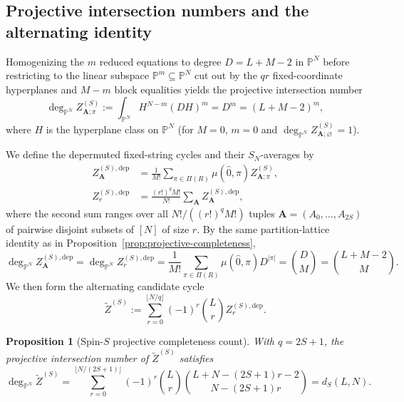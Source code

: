 \documentclass[11pt]{article}
\newtheorem{proposition}{Proposition}[section]
\theoremstyle{definition}
\begin{document}
\subsection{Projective intersection numbers and the alternating identity}

Homogenizing the $m$ reduced equations to degree $D=L+M-2$ in $\mathbb{P}^N$ before restricting to the linear subspace $\mathbb{P}^m\subseteq\mathbb{P}^N$ cut out by the $qr$ fixed-coordinate hyperplanes and $M-m$ block equalities yields the projective intersection number
\begin{equation}\label{eq:spin-S-partition-degree}
 \deg_{\mathbb{P}^N}Z_{\mathbf{A};\pi}^{(S)}
 :=\int_{\mathbb{P}^N}H^{N-m}(DH)^m=D^m=(L+M-2)^m,
\end{equation}
where $H$ is the hyperplane class on $\mathbb{P}^N$ (for $M=0$, $m=0$ and $\deg_{\mathbb{P}^N}Z_{\mathbf{A};\varnothing}^{(S)}=1$).

We define the depermuted fixed-string cycles and their $S_N$-averages by
\begin{equation}\label{eq:spin-S-partition-sums}
 \begin{aligned}
 Z_{\mathbf{A}}^{(S),\mathrm{dep}}
 &=\frac{1}{M!}\sum_{\pi\in\Pi(R)}
                 \mu(\hat{0},\pi)Z_{\mathbf{A};\pi}^{(S)},\\
 Z_r^{(S),\mathrm{dep}}
 &=\frac{(r!)^q M!}{N!}
       \sum_{\mathbf{A}}Z_{\mathbf{A}}^{(S),\mathrm{dep}},
 \end{aligned}
\end{equation}
where the second sum ranges over all $N!/((r!)^q M!)$ tuples $\mathbf{A}=(A_0,\ldots,A_{2S})$ of pairwise disjoint subsets of $[N]$ of size $r$.
By the same partition-lattice identity as in Proposition~\ref{prop:projective-completeness},
\[
 \deg_{\mathbb{P}^N}Z_{\mathbf{A}}^{(S),\mathrm{dep}}
 =\deg_{\mathbb{P}^N}Z_r^{(S),\mathrm{dep}}
 =\frac{1}{M!}\sum_{\pi\in\Pi(R)}\mu(\hat{0},\pi)D^{|\pi|}
 =\binom{D}{M}=\binom{L+M-2}{M}.
\]
We then form the alternating candidate cycle
\begin{equation}\label{eq:spin-S-alternating-sum}
 \tilde{Z}^{(S)}
 :=\sum_{r=0}^{\lfloor N/q\rfloor}(-1)^r\binom{L}{r}
                    Z_r^{(S),\mathrm{dep}}.
\end{equation}

\begin{proposition}[Spin-$S$ projective completeness count]
 \label{prop:spin-S-projective-count}
 With $q=2S+1$, the projective intersection number of $\tilde{Z}^{(S)}$ satisfies
 \begin{equation}\label{eq:spin-S-alternating-degree}
 \boxed{\deg_{\mathbb{P}^N}\tilde{Z}^{(S)}
 =\sum_{r=0}^{\lfloor N/(2S+1)\rfloor}(-1)^r\binom{L}{r}
       \binom{L+N-(2S+1)r-2}{N-(2S+1)r}
 =d_S(L,N).}
 \end{equation}
\end{proposition}
\end{document}
